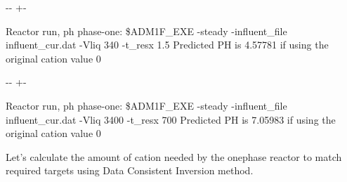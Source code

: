 \documentclass[a4paper,10pt,english]{sphinxmanual}
\newlength\nbsphinxcodecellspacing
\begin{document}
{

\kern-\sphinxverbatimsmallskipamount\kern-\baselineskip
\kern+\FrameHeightAdjust\kern-\fboxrule
\vspace{\nbsphinxcodecellspacing}

\begin{sphinxVerbatim}[commandchars=\\\{\}]
Reactor run, ph phase-one:
\$ADM1F\_EXE -steady -influent\_file influent\_cur.dat -Vliq 340 -t\_resx 1.5
Predicted PH is 4.57781 if using the original cation value 0
\end{sphinxVerbatim}
}

{
\begin{sphinxVerbatim}[commandchars=\\\{\}]
\llap{\color{nbsphinxin}[12]:\,\hspace{\fboxrule}\hspace{\fboxsep}}   
\PYG{p}{[}\PYG{p}{]} \PYG{p}{[}\PYG{p}{]}
\end{sphinxVerbatim}
}

{

\kern-\sphinxverbatimsmallskipamount\kern-\baselineskip
\kern+\FrameHeightAdjust\kern-\fboxrule
\vspace{\nbsphinxcodecellspacing}

\begin{sphinxVerbatim}[commandchars=\\\{\}]
Reactor run, ph phase-one:
\$ADM1F\_EXE -steady -influent\_file influent\_cur.dat -Vliq 3400 -t\_resx 700
Predicted PH is 7.05983 if using the original cation value 0
\end{sphinxVerbatim}
}

\sphinxAtStartPar
{} Let’s calculate the amount of cation needed by the one\sphinxhyphen{}phase reactor to match required  targets using Data Consistent Inversion method.
\end{document}
